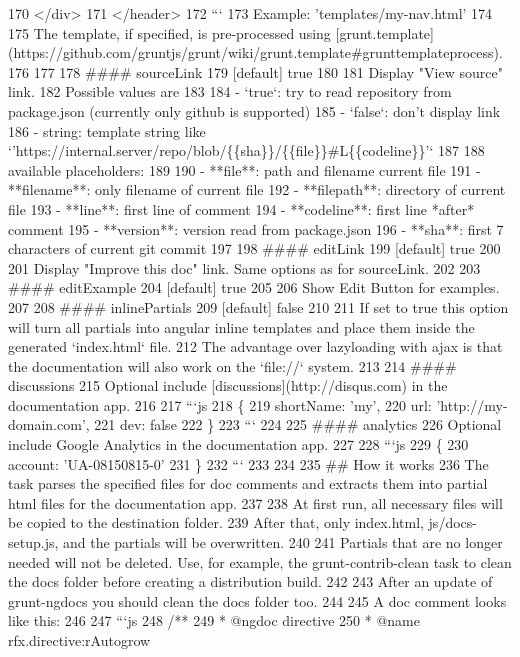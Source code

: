 \begin{DoxyCodeInclude}
170   </div>
171 </header>
172 ```
173 Example: 'templates/my-nav.html'
174 
175 The template, if specified, is pre-processed using
       [grunt.template](https://github.com/gruntjs/grunt/wiki/grunt.template#grunttemplateprocess).
176 
177 
178 #### sourceLink
179 [default] true
180 
181 Display "View source" link.
182 Possible values are
183 
184   - `true`: try to read repository from package.json (currently only github is supported)
185   - `false`: don't display link
186   - string: template string like `'https://internal.server/repo/blob/\{\{sha\}\}/\{\{file\}\}#L\{\{codeline\}\}'`
187 
188     available placeholders:
189 
190       - **file**: path and filename current file
191       - **filename**: only filename of current file
192       - **filepath**: directory of current file
193       - **line**: first line of comment
194       - **codeline**: first line *after* comment
195       - **version**: version read from package.json
196       - **sha**: first 7 characters of current git commit
197 
198 #### editLink
199 [default] true
200 
201 Display "Improve this doc" link. Same options as for sourceLink.
202 
203 #### editExample
204 [default] true
205 
206 Show Edit Button for examples.
207 
208 #### inlinePartials
209 [default] false
210 
211 If set to true this option will turn all partials into angular inline templates and place them inside the
       generated `index.html` file.
212 The advantage over lazyloading with ajax is that the documentation will also work on the `file://` system.
213 
214 #### discussions
215 Optional include [discussions](http://disqus.com) in the documentation app.
216 
217 ```js
218 \{
219   shortName: 'my',
220   url: 'http://my-domain.com',
221   dev: false
222 \}
223 ```
224 
225 #### analytics
226 Optional include Google Analytics in the documentation app.
227 
228 ```js
229 \{
230   account: 'UA-08150815-0'
231 \}
232 ```
233 
234 
235 ## How it works
236 The task parses the specified files for doc comments and extracts them into partial html files for the
       documentation app.
237 
238 At first run, all necessary files will be copied to the destination folder.
239 After that, only index.html, js/docs-setup.js, and the partials will be overwritten.
240 
241 Partials that are no longer needed will not be deleted. Use, for example, the grunt-contrib-clean task to
       clean the docs folder before creating a distribution build.
242 
243 After an update of grunt-ngdocs you should clean the docs folder too.
244 
245 A doc comment looks like this:
246 
247 ```js
248 /**
249  * @ngdoc directive
250  * @name rfx.directive:rAutogrow

\end{DoxyCodeInclude}
